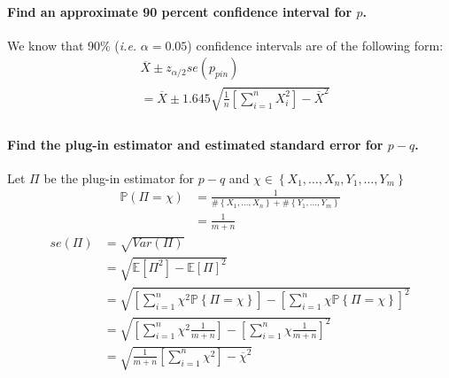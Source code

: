 \documentclass{article}
\newcommand{\E}{\mathbb{E}}
\renewcommand{\P}{\mathbb{P}}
\newcommand{\ie}{\textit{i.e. }}
\begin{document}
\paragraph{Find an approximate 90 percent confidence interval for $p$.\\}
We know that 90\% (\ie \(\alpha = 0.05\)) confidence intervals are of the following form:
\begin{align*}
     & \overline{X} \pm z_{\alpha/2} se(p_{pin})                                                      \\
     & = \overline{X} \pm 1.645 \sqrt{\frac{1}{n} \left[ \sum_{i=1}^n X_i^2 \right] - \overline{X}^2} \\
\end{align*}


\paragraph{Find the plug-in estimator and estimated standard error for $p-q$.\\}
Let \(\Pi\) be the plug-in estimator for \(p-q\) and \(\chi \in \left\{ X_1, \ldots, X_n, Y_1, \ldots, Y_m\right\}\)
\begin{align*}
    \P(\Pi = \chi)
     & = \frac{1}{\#\left\{ X_1, \ldots, X_n\right\} + \#\left\{ Y_1, \ldots, Y_m\right\}} \\
     & = \frac{1}{m+n}
\end{align*}
\begin{align*}
    se (\Pi)
     & = \sqrt{Var(\Pi)}                                                                                                                           \\
     & = \sqrt{\E[\Pi^2] - \E[\Pi]^2}                                                                                                              \\
     & = \sqrt{\left[\sum_{i=1}^n \chi^2 \P \left\{ \Pi = \chi \right\}\right] - \left[\sum_{i=1}^n \chi \P \left\{ \Pi = \chi \right\} \right]^2} \\
     & = \sqrt{\left[\sum_{i=1}^n \chi^2 \frac{1}{m+n}\right] - \left[\sum_{i=1}^n \chi \frac{1}{m+n} \right]^2}                                   \\
     & = \sqrt{\frac{1}{m+n}\left[\sum_{i=1}^n \chi^2\right] - \overline{\chi}^2}                                                                  \\
\end{align*}
\end{document}
